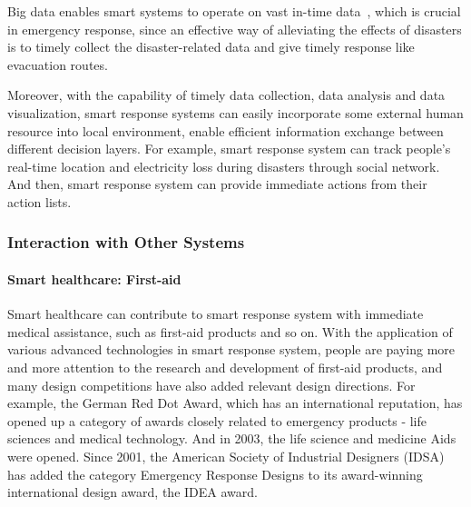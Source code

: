 \documentclass[letterpaper, twocolumn, 10pt, conference]{IEEEtran}
\begin{document}
Big data enables smart systems to operate on vast in-time data~\cite{hashem2015rise}, which is crucial in emergency response, since an effective way of alleviating the effects of disasters is to timely collect the disaster-related data and give timely response like evacuation routes.

Moreover, with the capability of timely data collection, data analysis and data visualization, smart response systems can easily incorporate some external human resource into local environment, enable efficient information exchange between different decision layers. For example, smart response system can track people’s real-time location and electricity loss during disasters through social network. And then, smart response system can provide immediate actions from their action lists. 





\subsubsection{Interaction with Other Systems}
\label{sssec:zj:smart_emergency:interaction}


\paragraph{Smart healthcare: First-aid}

Smart healthcare can contribute to smart response system with immediate medical assistance, such as first-aid products and so on. With the application of various advanced technologies in smart response system, people are paying more and more attention to the research and development of first-aid products, and many design competitions have also added relevant design directions. For example, the German Red Dot Award, which has an international reputation, has opened up a category of awards closely related to emergency products - life sciences and medical technology. And in 2003, the life science and medicine Aids were opened. Since 2001, the American Society of Industrial Designers (IDSA) has added the category Emergency Response Designs to its award-winning international design award, the IDEA award. 
\end{document}
